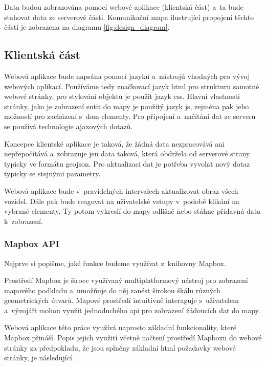 Data budou zobrazována pomocí webové aplikace (klientská část) a~ta bude stahovat data ze serverové části. Komunikační mapa ilustrující propojení těchto částí je zobrazena na diagramu \ref{fig:design_diagram}.


\subsection{Klientská část}


Webová aplikace bude napsána pomocí jazyků a~nástrojů vhodných pro vývoj webových aplikací. Používáme tedy značkovací jazyk \gls{html} pro strukturu samotné webové stránky, pro stylování objektů je použit jazyk \gls{css}. Hlavní vlastnosti stránky, jako je zobrazení entit do mapy je použitý jazyk \gls{js}, zejména pak jeho možností pro zacházení s~\gls{dom} elementy. Pro připojení a~načítání dat ze serveru se používá technologie \gls{ajax}ových dotazů.


\bigbreak


Koncepce klientské aplikace je taková, že žádná data nezpracovává ani nepřepočítává a~zobrazuje jen data taková, která obdržela od serverové strany typicky ve formátu \gls{geojson}. Pro aktualizaci dat je potřeba vyvolat nový dotaz typicky se stejnými parametry.


\bigbreak


Webová aplikace bude v~pravidelných intervalech aktualizovat obraz všech vozidel. Dále pak bude reagovat na uživatelské vstupy v~podobě klikání na vybrané elementy. Ty potom vykreslí do mapy odlišně nebo stáhne přídavná data k~zobrazení.


\subsubsection{Mapbox API}


Nejprve si popišme, jaké funkce budeme využívat z~knihovny Mapbox.


\bigbreak


Prostředí Mapbox je široce využívaný multiplatformový nástroj pro zobrazení mapového podkladu a~umožňuje do něj zanést širokou škálu různých geometrických útvarů. Mapové prostředí intuitivně interaguje s~uživatelem a~vývojáři mohou využít jednoduchého \gls{api} pro zobrazení žádoucích dat do mapy.


\bigbreak


Webová aplikace této práce využívá naprosto základní funkcionality, které Mapbox přináší. Popis jejich využití včetně načtení prostředí Mapboxu do webové stránky za předpokladu, že jsou splněny základní \gls{html} požadavky webové stránky, je následující.


